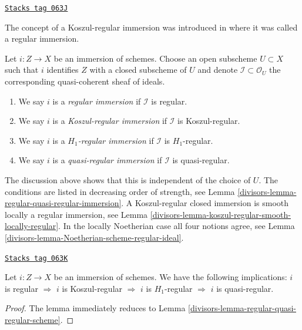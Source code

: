 \begin{definition}
\label{divisors-definition-regular-immersion}
\href{https://stacks.math.columbia.edu/tag/063J}{\texttt{Stacks tag 063J}}

\begin{reference}
The concept of a Koszul-regular immersion was introduced in
\cite[Expose VII, Definition 1.4]{SGA6} where it was called a
regular immersion.
\end{reference}
Let $i : Z \to X$ be an immersion of schemes. Choose an open subscheme
$U \subset X$ such that $i$ identifies $Z$ with a closed
subscheme of $U$ and denote $\mathcal{I} \subset \mathcal{O}_U$
the corresponding quasi-coherent sheaf of ideals.
\begin{enumerate}
\item We say $i$ is a {\it regular immersion} if
$\mathcal{I}$ is regular.
\item We say $i$ is a {\it Koszul-regular immersion} if
$\mathcal{I}$ is Koszul-regular.
\item We say $i$ is a {\it $H_1$-regular immersion} if
$\mathcal{I}$ is $H_1$-regular.
\item We say $i$ is a {\it quasi-regular immersion} if
$\mathcal{I}$ is quasi-regular.
\end{enumerate}
\end{definition}

The discussion above shows that this is independent of the choice
of $U$. The conditions are listed in decreasing order of strength, see
Lemma \ref{divisors-lemma-regular-quasi-regular-immersion}.
A Koszul-regular closed immersion is smooth locally a regular immersion, see
Lemma \ref{divisors-lemma-koszul-regular-smooth-locally-regular}.
In the locally Noetherian case all four notions agree, see
Lemma \ref{divisors-lemma-Noetherian-scheme-regular-ideal}.

\begin{lemma}
\label{divisors-lemma-regular-quasi-regular-immersion}
\href{https://stacks.math.columbia.edu/tag/063K}{\texttt{Stacks tag 063K}}

Let $i : Z \to X$ be an immersion of schemes.
We have the following implications:
$i$ is regular $\Rightarrow$
$i$ is Koszul-regular $\Rightarrow$
$i$ is $H_1$-regular $\Rightarrow$
$i$ is quasi-regular.
\end{lemma}

\begin{proof}

The lemma immediately reduces to
Lemma \ref{divisors-lemma-regular-quasi-regular-scheme}.
\end{proof}

